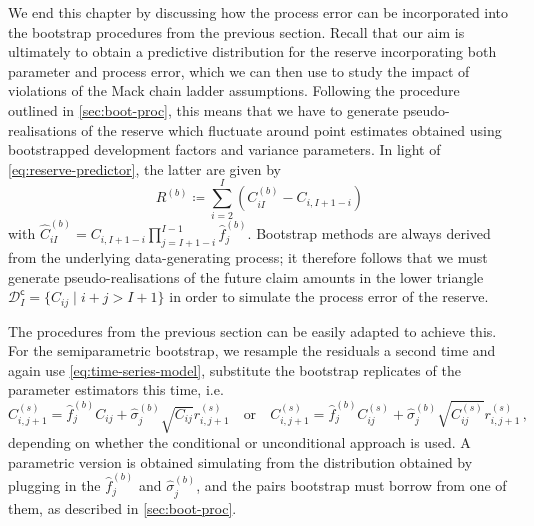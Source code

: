 \documentclass[a4paper]{book}
\begin{document}
We end this chapter by discussing how the process error can be incorporated into the bootstrap procedures from the previous section. Recall that our aim is ultimately to obtain a predictive distribution for the reserve incorporating both parameter and process error, which we can then use to study the impact of violations of the Mack chain ladder assumptions. Following the procedure outlined in \cref{sec:boot-proc}, this means that we have to generate pseudo-realisations of the reserve which fluctuate around point estimates obtained using bootstrapped development factors and variance parameters. In light of \cref{eq:reserve-predictor}, the latter are given by
\begin{equation}
  R^{(b)} \coloneqq \sum_{i = 2}^I (C^{(b)}_{iI} - C_{i, I + 1 - i})
\end{equation}
with $\widehat{C}^{(b)}_{iI} = C_{i, I + 1 - i} \prod_{j = I + 1 - i}^{I - 1} \widehat{f}^{(b)}_j$. Bootstrap methods are always derived from the underlying data-generating process; it therefore follows that we must generate pseudo-realisations of the future claim amounts in the lower triangle $\mathcal{D}^{\mathsf{c}}_I = \{ C_{ij} \mid i + j > I + 1 \}$ in order to simulate the process error of the reserve.

The procedures from the previous section can be easily adapted to achieve this. For the semiparametric bootstrap, we resample the residuals a second time and again use \cref{eq:time-series-model}, substitute the bootstrap replicates of the parameter estimators this time, i.e.\
\begin{equation}
  C^{(s)}_{i, j + 1} = \widehat{f}^{(b)}_j C_{ij} + \widehat{\sigma}^{(b)}_j \sqrt{C_{ij}} r^{(s)}_{i, j + 1} \quad \text{or} \quad C^{(s)}_{i, j + 1} = \widehat{f}^{(b)}_j C^{(s)}_{ij} + \widehat{\sigma}^{(b)}_j \sqrt{C^{(s)}_{ij}} r^{(s)}_{i, j + 1} \,,
\end{equation}
depending on whether the conditional or unconditional approach is used. A parametric version is obtained simulating from the distribution obtained by plugging in the $\widehat{f}^{(b)}_j$ and $\widehat{\sigma}^{(b)}_j$, and the pairs bootstrap must borrow from one of them, as described in \cref{sec:boot-proc}.
\end{document}
